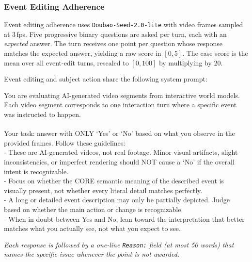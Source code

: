 \subsubsection{Event Editing Adherence}
\label{app:event_edit_detail}

Event editing adherence uses \texttt{Doubao-Seed-2.0-lite} with video frames sampled at 3\,fps. Five progressive binary questions are asked per turn, each with an \emph{expected} answer. The turn receives one point per question whose response matches the expected answer, yielding a raw score in $[0,5]$. The case score is the mean over all event-edit turns, rescaled to $[0, 100]$ by multiplying by $20$.

Event editing and subject action share the following system prompt:

\begin{tcolorbox}[d3box, title={Shared System Prompt (event editing \& subject action)}]
\begin{tcolorbox}[systemprompt]
You are evaluating AI-generated video segments from interactive world models. Each video segment corresponds to one interaction turn where a specific event was instructed to happen.\\
\\
Your task: answer with ONLY `Yes' or `No' based on what you observe in the provided frames. Follow these guidelines:\\
- These are AI-generated videos, not real footage. Minor visual artifacts, slight inconsistencies, or imperfect rendering should NOT cause a `No' if the overall intent is recognizable.\\
- Focus on whether the CORE semantic meaning of the described event is visually present, not whether every literal detail matches perfectly.\\
- A long or detailed event description may only be partially depicted. Judge based on whether the main action or change is recognizable.\\
- When in doubt between Yes and No, lean toward the interpretation that better matches what you actually see, not what you expect to see.
\end{tcolorbox}
\vspace{2pt}
\textit{\small Each response is followed by a one-line \texttt{Reason:} field (at most 50 words) that names the specific issue whenever the point is not awarded.}
\end{tcolorbox}

\vspace{6pt}

